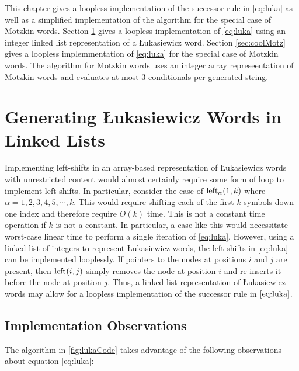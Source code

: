 This chapter gives a loopless implementation of the successor rule in \ref{eq:luka} as well as a simplified implementation of the algorithm for the special case of Motzkin words. Section \ref{sec:luka_ll} gives a loopless implementation of \eqref{eq:luka} using an integer linked list representation of a Łukasiewicz word. Section \ref{sec:coolMotz} gives a loopless implemmentation of \eqref{eq:luka} for the special case of Motzkin words.  The algorithm for Motzkin words uses an integer array represeentation of Motzkin words and evaluates at most 3 conditionals per generated string. 


\section{Generating Łukasiewicz Words in Linked Lists}\label{sec:luka_ll}
Implementing left-shifts in an array-based representation of Łukasiewicz words with unrestricted content would almost certainly require some form of loop to implement left-shifts.  In particular, consider the case of $\lshiftindex[\alpha]{1}{k}$ where $\alpha=1,2,3,4,5,\cdots,k$.  This would require shifting each of the first $k$ symbols down one index and therefore require $O(k)$ time.  This is not a constant time operation if $k$ is not a constant.  In particular, a case like this would necessitate worst-case linear time to perform a single iteration of \eqref{eq:luka}.
However, using a linked-list of integers to represent Łukasiewicz words, the left-shifts in \eqref{eq:luka} can be implemented looplessly.  If pointers to the nodes at positions $i$ and $j$ are present, then $\lshiftindex{i}{j}$ simply removes the node at position $i$ and re-inserts it before the node at position $j$.  Thus, a linked-list representation of Łukasiewicz words may allow for a loopless implementation of the successor rule in $\ref{eq:luka}$.

\subsection{Implementation Observations}
The algorithm in \ref{fig:lukaCode} takes advantage of the following observations about equation \ref{eq:luka}:

